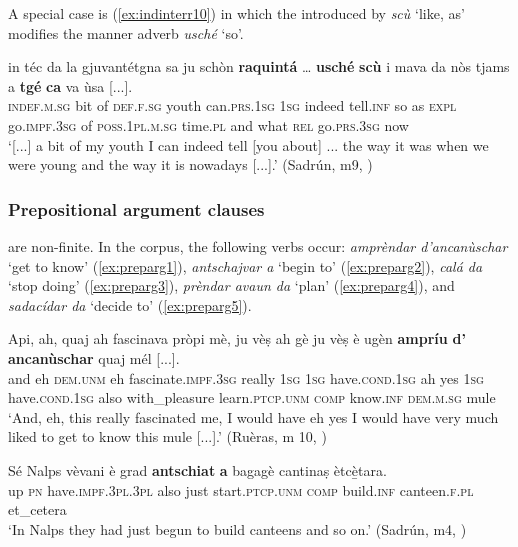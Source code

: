A special case is (\ref{ex:indinterr10}) in which the  introduced by \textit{scù} `like, as' modifies the manner adverb \textit{usché} `so'.

\ea
\label{ex:indinterr10}
\gll [...] in téc da la gjuvantétgna sa ju schòn \textbf{raquintá} … \textbf{usché} \textbf{scù} i mava da nòs tjams a \textbf{tgé} \textbf{ca} va ùsa [...].\\
{} \textsc{indef.m.sg} bit of \textsc{def.f.sg} youth can.\textsc{prs.1sg} \textsc{1sg} indeed tell.\textsc{inf} {} so as \textsc{expl} go.\textsc{impf.3sg} of \textsc{poss.1pl.m.sg} time.\textsc{pl} and what \textsc{rel} go.\textsc{prs.3sg} now \\
\glt `[...] a bit of my youth I can indeed tell [you about] ... the way it was when we were young and the way it is nowadays [...].' (Sadrún, m9, )
\z

\subsubsection{Prepositional argument clauses}\label{sec:6.2.1.4}
 are non-finite. In the corpus, the following verbs occur: \textit{amprèndar d'ancanùschar} `get to know' (\ref{ex:preparg1}), \textit{antschajvar a} `begin to' (\ref{ex:preparg2}), \textit{calá da} `stop doing' (\ref{ex:preparg3}), \textit{prèndar avaun da} `plan' (\ref{ex:preparg4}), and \textit{sadacídar da} `decide to' (\ref{ex:preparg5}).
 
\ea
\label{ex:preparg1}
\gll Api, ah, quaj ah fascinava pròpi mè, ju vèṣ ah gè ju vèṣ è ugèn \textbf{ampríu} \textbf{d’} \textbf{ancanùschar} quaj mél [...]. \\
and eh \textsc{dem.unm} eh fascinate.\textsc{impf.3sg} really \textsc{1sg}  \textsc{1sg} have.\textsc{cond.1sg} ah yes \textsc{1sg} have.\textsc{cond.1sg} also with\_pleasure learn.\textsc{ptcp.unm} \textsc{comp} know.\textsc{inf} \textsc{dem.m.sg} mule\\
\glt `And, eh, this really fascinated me, I would have eh yes I would have very much liked to get to know this mule [...].' (Ruèras, m 10, )
\z

\ea
\label{ex:preparg2}
\gll  Sé Nalps vèvani è grad \textbf{antschiat} \textbf{a} bagagè cantinaṣ ètcè̱tara.\\
up \textsc{pn} have.\textsc{impf.3pl.3pl} also just start.\textsc{ptcp.unm} \textsc{comp} build.\textsc{inf} canteen.\textsc{f.pl} et\_cetera\\
\glt `In Nalps they had just begun to build canteens and so on.' (Sadrún, m4, )
\z

